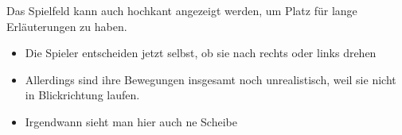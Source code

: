 \documentclass[preview]{standalone}
\begin{document}
\begin{center}
Das Spielfeld kann auch hochkant angezeigt werden, um Platz für lange Erläuterungen zu haben.
        \begin{itemize}
         \item Die Spieler entscheiden jetzt selbst, ob sie nach rechts oder links drehen
         \item Allerdings sind ihre Bewegungen insgesamt noch unrealistisch, weil sie nicht in Blickrichtung laufen.
         \item Irgendwann sieht man hier auch ne Scheibe
        \end{itemize}
\end{center}
\end{document}
